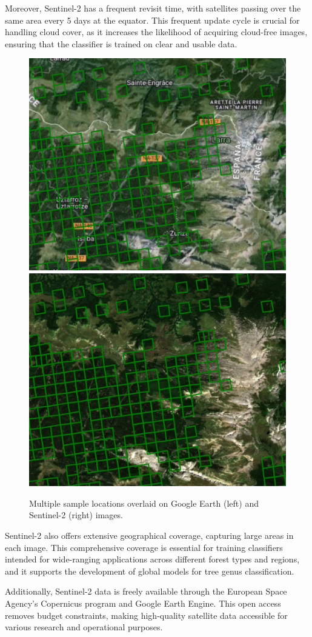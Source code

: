 Moreover, Sentinel-2 has a frequent revisit time, with satellites passing over the same area every 5 days at the equator. This frequent update cycle is crucial for handling cloud cover, as it increases the likelihood of acquiring cloud-free images, ensuring that the classifier is trained on clear and usable data.

\begin{figure}[!thb]
    \centering

    \includegraphics[width=0.48\linewidth]{figures/figures_sentinel/sample_area_earth.png}
    \includegraphics[width=0.48\linewidth]{figures/figures_sentinel/sample_area_sentinel.png}

    \caption{Multiple sample locations overlaid on Google Earth (left) and Sentinel-2 (right) images.}
    \label{fig:label_sample_area}
\end{figure}

Sentinel-2 also offers extensive geographical coverage, capturing large areas in each image. This comprehensive coverage is essential for training classifiers intended for wide-ranging applications across different forest types and regions, and it supports the development of global models for tree genus classification.

Additionally, Sentinel-2 data is freely available through the European Space Agency's Copernicus program and Google Earth Engine. This open access removes budget constraints, making high-quality satellite data accessible for various research and operational purposes.

